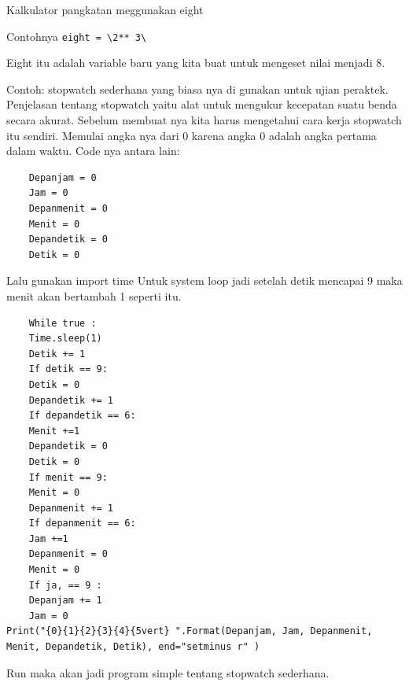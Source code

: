 Kalkulator pangkatan meggunakan eight 

Contohnya \verb|eight = \2** 3\| 

Eight itu adalah variable baru yang kita buat untuk mengeset nilai menjadi 8.

Contoh: stopwatch sederhana yang biasa nya di gunakan untuk ujian peraktek.  
Penjelasan tentang stopwatch yaitu alat untuk mengukur kecepatan suatu benda secara akurat. 
Sebelum membuat nya kita harus mengetahui cara kerja stopwatch itu sendiri. Memulai angka nya dari 0 karena angka 0 adalah angka pertama dalam waktu.
Code nya antara lain:
 \begin{verbatim}
	Depanjam = 0 
	Jam = 0 
	Depanmenit = 0 
	Menit = 0 
	Depandetik = 0 
	Detik = 0
 \end{verbatim}
Lalu gunakan import time 
Untuk system loop jadi setelah detik mencapai 9 maka menit akan bertambah 1 seperti itu. 
 \begin{verbatim}
	While true : 
	Time.sleep(1) 
	Detik += 1 
	If detik == 9: 
	Detik = 0 
	Depandetik += 1 
	If depandetik == 6:
	Menit +=1 
	Depandetik = 0 
	Detik = 0 
	If menit == 9: 
	Menit = 0 
	Depanmenit += 1 
	If depanmenit == 6: 
	Jam +=1 
	Depanmenit = 0 
	Menit = 0 
	If ja, == 9 : 
	Depanjam += 1 
	Jam = 0 
Print("{0}{1}{2}{3}{4}{5vert} ".Format(Depanjam, Jam, Depanmenit, 
Menit, Depandetik, Detik), end="setminus r" ) 
\end{verbatim}
Run maka akan jadi program simple tentang stopwatch sederhana.

